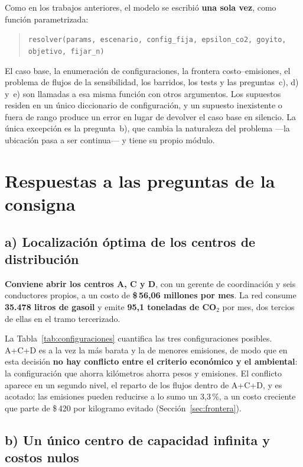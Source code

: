 \documentclass[10pt,a4paper]{article}
\begin{document}
Como en los trabajos anteriores, el modelo se escribió \textbf{una sola vez},
como función parametrizada:
\begin{quote}
\centering\small
\texttt{resolver(params, escenario, config\_fija, epsilon\_co2, goyito, objetivo, fijar\_n)}
\end{quote}
El caso base, la enumeración de configuraciones, la frontera costo–emisiones,
el problema de flujos de la sensibilidad, los barridos, los tests y las
preguntas~c), d) y~e) son llamadas a esa misma función con otros argumentos.
Los supuestos residen en un único diccionario de configuración, y un supuesto
inexistente o fuera de rango produce un error en lugar de devolver el caso
base en silencio. La única excepción es la pregunta~b), que cambia la
naturaleza del problema —la ubicación pasa a ser continua— y tiene su propio
módulo.

\section{Respuestas a las preguntas de la consigna}
\label{sec:preguntas}

\subsection{a) Localización óptima de los centros de distribución}
\label{sec:pa}

\textbf{Conviene abrir los centros A, C y D}, con un gerente de coordinación y
seis conductores propios, a un costo de \textbf{\$\,56,06 millones por mes}.
La red consume \textbf{35.478 litros de gasoil} y emite \textbf{95,1 toneladas
de CO$_2$} por mes, dos tercios de ellas en el tramo tercerizado.

La Tabla~\ref{tab:configuraciones} cuantifica las tres configuraciones
posibles. A+C+D es a la vez la más barata y la de menores emisiones, de modo
que en esta decisión \textbf{no hay conflicto entre el criterio económico y el
ambiental}: la configuración que ahorra kilómetros ahorra pesos y emisiones.
El conflicto aparece en un segundo nivel, el reparto de los flujos dentro de
A+C+D, y es acotado: las emisiones pueden reducirse a lo sumo un 3,3\,\%, a
un costo creciente que parte de \$\,420 por kilogramo evitado
(Sección~\ref{sec:frontera}).

\subsection{b) Un único centro de capacidad infinita y costos nulos}
\label{sec:pb}
\end{document}
